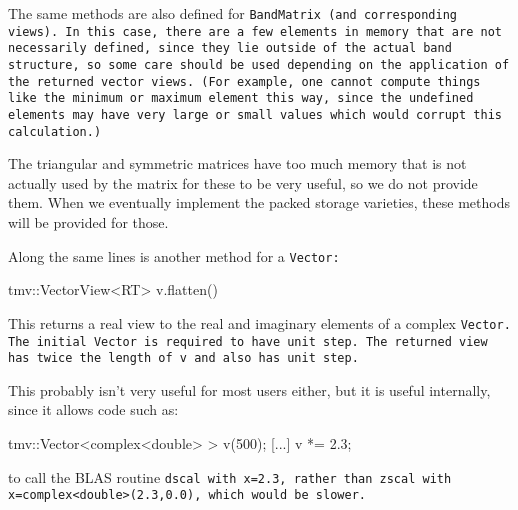The same methods are also defined for \tt{BandMatrix} (and corresponding views).
In this case, there are a few elements in memory that are not necessarily
defined, since they lie outside of the actual band structure, so some care
should be used depending on the application of the returned vector views.  
(For example, one cannot compute things like the
minimum or maximum element this way, since the undefined elements may
have very large or small values which would corrupt this calculation.)

The triangular and symmetric matrices have too much memory that is not
actually used by the matrix for these to be very useful, so we do not provide them.
When we eventually implement the packed storage varieties, these methods will
be provided for those.

Along the same lines is another method for a \tt{Vector}:
\begin{tmvcode}
tmv::VectorView<RT> v.flatten()
\end{tmvcode}
This returns a real view to the real and imaginary elements of a complex \tt{Vector}. 
The initial \tt{Vector} is required to have unit step.  The returned view has twice the 
length of \tt{v} and also has unit step.

This probably isn't very useful for most users either, but it is useful internally,
since it allows code such as:
\begin{tmvcode}
tmv::Vector<complex<double> > v(500);
[...]
v *= 2.3;
\end{tmvcode}
to call the BLAS routine \tt{dscal} with \tt{x=2.3}, rather than \tt{zscal}
with \tt{x=complex<double>(2.3,0.0)}, which would be slower.

